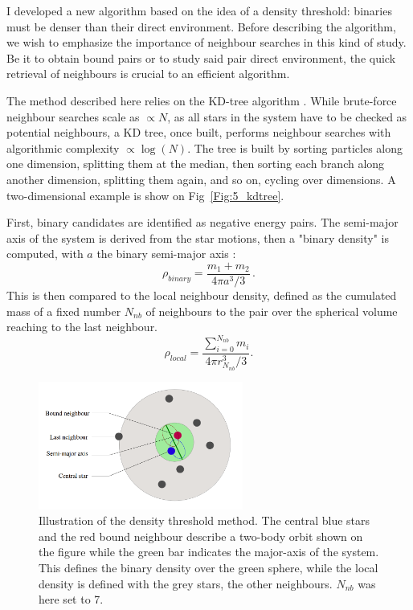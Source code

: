 I developed a new algorithm based on the idea of a density threshold: binaries must be denser than their direct environment. Before describing the algorithm, we wish to emphasize the importance of neighbour searches in this kind of study. Be it to obtain bound pairs or to study said pair direct environment, the quick retrieval of neighbours is crucial to an efficient algorithm.

The method described here relies on the KD-tree algorithm \citep{numericalrecipes}. While brute-force neighbour searches scale as $\propto N$, as all stars in the system have to be checked as potential neighbours, a KD tree, once built, performs neighbour searches with algorithmic complexity $\propto\log (N)$. The tree is built by sorting particles along one dimension, splitting them at the median, then sorting each branch along another dimension, splitting them again, and so on, cycling over dimensions. A two-dimensional example is show on Fig~\ref{Fig:5_kdtree}.





First, binary candidates are identified as negative energy pairs. The semi-major axis of the system is derived from the star motions, then a "binary density" is computed, with $a$ the binary semi-major axis :
\begin{equation}
 \rho_{binary} = \frac{m_1 + m_2 }{4\pi a^3/3 }\, .
\end{equation}
This is then compared to the local neighbour density, defined as the cumulated mass of a fixed number $N_{nb}$ of neighbours to the pair over the spherical volume reaching to the last neighbour.
\begin{equation}
 \rho_{local} =  \frac{\sum\limits_{i=0}^{N_{nb}} m_i}{ 4 \pi r_{N_{nb}}^3 /3} .
\end{equation}


\begin{figure}
\begin{center}
\includegraphics[width=0.6\textwidth]{Figures/5_neighbours}
\caption[Illustration of the density threshold method]{Illustration of the density threshold method. The central blue stars and the red bound neighbour describe a two-body orbit shown on the figure while the green bar indicates the major-axis of the system. This defines the binary density over the green sphere, while the local density is defined with the grey stars, the other neighbours. $N_{nb}$ was here set to 7. }
\label{Fig:5_neighbours}
\end{center}
\end{figure}




